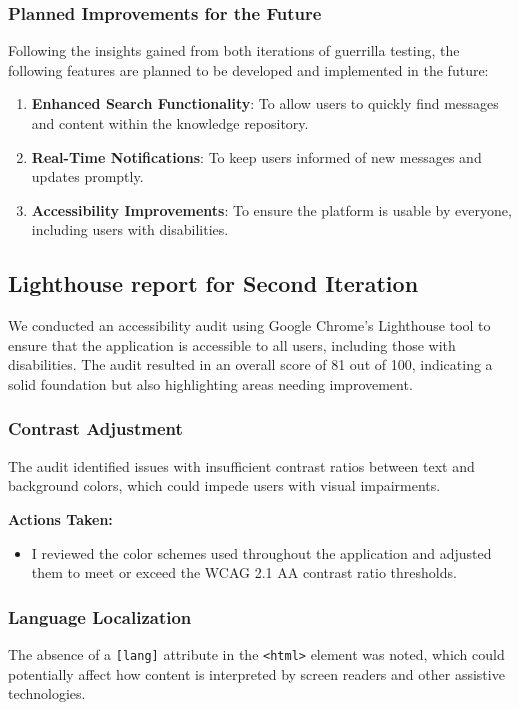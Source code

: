 \documentclass[12pt,a4paper]{article}
\begin{document}
\subsubsection*{Planned Improvements for the Future}
Following the insights gained from both iterations of guerrilla testing, the following features are planned to be developed and implemented in the future:
\begin{enumerate}
    \item \textbf{Enhanced Search Functionality}: To allow users to quickly find messages and content within the knowledge repository.
    \item \textbf{Real-Time Notifications}: To keep users informed of new messages and updates promptly.
    \item \textbf{Accessibility Improvements}: To ensure the platform is usable by everyone, including users with disabilities.
\end{enumerate}

\subsection{Lighthouse report for Second Iteration}
We conducted an accessibility audit using Google Chrome's Lighthouse tool to ensure that the application is accessible to all users, including those with disabilities. The audit resulted in an overall score of 81 out of 100, indicating a solid foundation but also highlighting areas needing improvement.

\subsubsection{Contrast Adjustment}
The audit identified issues with insufficient contrast ratios between text and background colors, which could impede users with visual impairments. 

\textbf{Actions Taken:}
\begin{itemize}
    \item I reviewed the color schemes used throughout the application and adjusted them to meet or exceed the WCAG 2.1 AA contrast ratio thresholds.
\end{itemize}

\subsubsection{Language Localization}
The absence of a \texttt{[lang]} attribute in the \texttt{<html>} element was noted, which could potentially affect how content is interpreted by screen readers and other assistive technologies.
\end{document}
